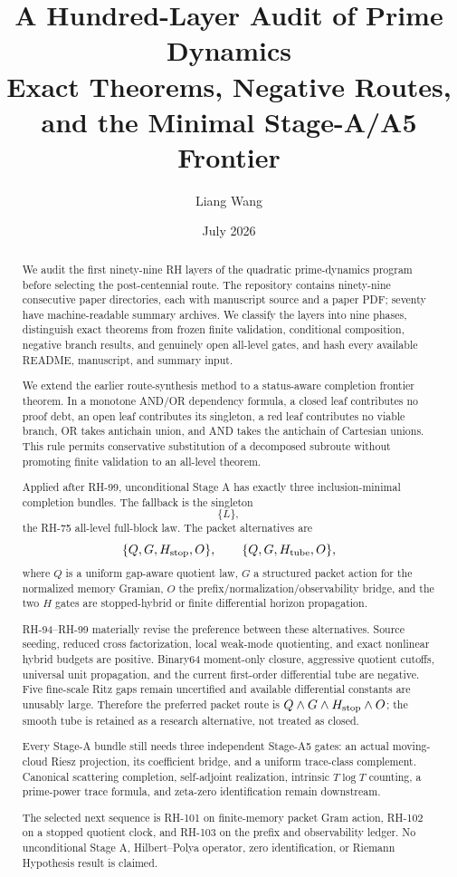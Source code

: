 \documentclass[11pt]{article}
\title{A Hundred-Layer Audit of Prime Dynamics\\
\large Exact Theorems, Negative Routes, and the Minimal Stage-A/A5 Frontier}
\author{Liang Wang}
\date{July 2026}
\theoremstyle{definition}
\theoremstyle{remark}
\begin{document}
\maketitle

\begin{abstract}
We audit the first ninety-nine RH layers of the quadratic prime-dynamics
program before selecting the post-centennial route.  The repository contains
ninety-nine consecutive paper directories, each with manuscript source and a
paper PDF; seventy have machine-readable summary archives.  We classify the
layers into nine phases, distinguish exact theorems from frozen finite
validation, conditional composition, negative branch results, and genuinely
open all-level gates, and hash every available README, manuscript, and summary
input.

We extend the earlier route-synthesis method to a status-aware completion
frontier theorem.  In a monotone AND/OR dependency formula, a closed leaf
contributes no proof debt, an open leaf contributes its singleton, a red leaf
contributes no viable branch, OR takes antichain union, and AND takes the
antichain of Cartesian unions.  This rule permits conservative substitution
of a decomposed subroute without promoting finite validation to an all-level
theorem.

Applied after RH-99, unconditional Stage A has exactly three
inclusion-minimal completion bundles.  The fallback is the singleton
\[
 \{L\},
\]
the RH-75 all-level full-block law.  The packet alternatives are
\[
 \{Q,G,H_{\rm stop},O\},
 \qquad
 \{Q,G,H_{\rm tube},O\},
\]
where $Q$ is a uniform gap-aware quotient law, $G$ a structured packet action
for the normalized memory Gramian, $O$ the prefix/normalization/observability
bridge, and the two $H$ gates are stopped-hybrid or finite differential
horizon propagation.

RH-94--RH-99 materially revise the preference between these alternatives.
Source seeding, reduced cross factorization, local weak-mode quotienting, and
exact nonlinear hybrid budgets are positive.  Binary64 moment-only closure,
aggressive quotient cutoffs, universal unit propagation, and the current
first-order differential tube are negative.  Five fine-scale Ritz gaps remain
uncertified and available differential constants are unusably large.
Therefore the preferred packet route is
$Q\wedge G\wedge H_{\rm stop}\wedge O$; the smooth tube is retained as a
research alternative, not treated as closed.

Every Stage-A bundle still needs three independent Stage-A5 gates: an actual
moving-cloud Riesz projection, its coefficient bridge, and a uniform
trace-class complement.  Canonical scattering completion, self-adjoint
realization, intrinsic $T\log T$ counting, a prime-power trace formula, and
zeta-zero identification remain downstream.

The selected next sequence is RH-101 on finite-memory packet Gram action,
RH-102 on a stopped quotient clock, and RH-103 on the prefix and observability
ledger.  No unconditional Stage A, Hilbert--Polya operator, zero
identification, or Riemann Hypothesis result is claimed.
\end{abstract}
\end{document}
